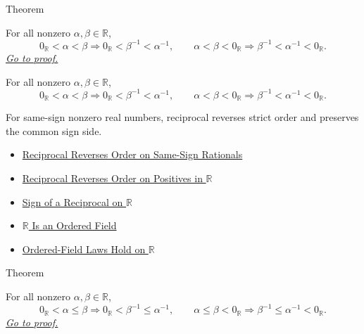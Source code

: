 \begin{theorembox}{Theorem}
\begin{theorem}
\label{thm:reciprocal-reverses-order-on-same-sign-r}
For all nonzero $\alpha,\beta\in\mathbb{R}$,
\[
0_{\mathbb{R}}<\alpha<\beta
\Longrightarrow
0_{\mathbb{R}}<\beta^{-1}<\alpha^{-1},
\qquad
\alpha<\beta<0_{\mathbb{R}}
\Longrightarrow
\beta^{-1}<\alpha^{-1}<0_{\mathbb{R}}.
\]
\hyperref[prf:reciprocal-reverses-order-on-same-sign-r]{\textit{Go to proof.}}
\end{theorem}
\end{theorembox}

\begin{remark*}
For all nonzero $\alpha,\beta\in\mathbb{R}$,
\[
0_{\mathbb{R}}<\alpha<\beta
\Longrightarrow
0_{\mathbb{R}}<\beta^{-1}<\alpha^{-1},
\qquad
\alpha<\beta<0_{\mathbb{R}}
\Longrightarrow
\beta^{-1}<\alpha^{-1}<0_{\mathbb{R}}.
\]
\end{remark*}

\begin{remark*}[Interpretation]
For same-sign nonzero real numbers, reciprocal reverses strict order and
preserves the common sign side.
\end{remark*}

\begin{dependencies}
\begin{itemize}
  \item \hyperref[thm:reciprocal-reverses-order-on-same-sign-q]{Reciprocal Reverses Order on Same-Sign Rationals}
  \item \hyperref[thm:reciprocal-reverses-order-on-positives-r]{Reciprocal Reverses Order on Positives in $\mathbb{R}$}
  \item \hyperref[thm:sign-of-reciprocal-r]{Sign of a Reciprocal on $\mathbb{R}$}
  \item \hyperref[thm:r-is-an-ordered-field]{$\mathbb{R}$ Is an Ordered Field}
  \item \hyperref[cor:ordered-field-laws-on-r]{Ordered-Field Laws Hold on $\mathbb{R}$}
\end{itemize}
\end{dependencies}

\begin{theorembox}{Theorem}
\begin{theorem}
\label{thm:reciprocal-reverses-nonstrict-order-on-same-sign-r}
For all nonzero $\alpha,\beta\in\mathbb{R}$,
\[
0_{\mathbb{R}}<\alpha\le\beta
\Longrightarrow
0_{\mathbb{R}}<\beta^{-1}\le\alpha^{-1},
\qquad
\alpha\le\beta<0_{\mathbb{R}}
\Longrightarrow
\beta^{-1}\le\alpha^{-1}<0_{\mathbb{R}}.
\]
\hyperref[prf:reciprocal-reverses-nonstrict-order-on-same-sign-r]{\textit{Go to proof.}}
\end{theorem}
\end{theorembox}

